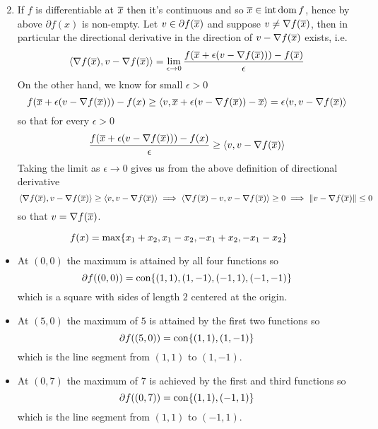 \documentclass{article}
\newenvironment{ex}[1]
  {\renewcommand\theexercise{#1}\exercise}
  {\endexercise}
\DeclareMathOperator*{\dom}{dom}
\DeclareMathOperator*{\inte}{int}
\DeclareMathOperator*{\con}{con}
\begin{document}
\begin{ex}{7.20}
\begin{enumerate}[label=(\alph*)]
$$      $$
    \item
      If $f$ is differentiable at $\overline{x}$ then it's continuous and so $\xb \in \inte \dom f$, hence by above $\partial f(x)$ is non-empty. Let $v \in \partial f(\overline{x})$ and suppose $v \ne \nabla f(\overline{x})$, then in particular the directional derivative in the direction of $v - \nabla f(\overline{x})$ exists, i.e.
      $$
      \langle\nabla f(\overline{x}), v - \nabla f(\overline{x})\rangle = \lim_{\epsilon \to 0} \frac{f(\overline{x} + \epsilon (v - \nabla f(\overline{x}))) - f(\overline{x})}{\epsilon}
      $$
      On the other hand, we know for small $\epsilon > 0$
      $$
      f(\overline{x} + \epsilon (v - \nabla f(\overline{x}))) - f(x) \ge \langle v, \overline{x} + \epsilon (v - \nabla f(\overline{x})) - \overline{x}\rangle = \epsilon \langle v, v - \nabla f(\overline{x})\rangle
      $$
      so that for every $\epsilon > 0$
      $$
      \frac{f(\overline{x} + \epsilon (v - \nabla f(\overline{x}))) - f(x)}{\epsilon} \ge \langle v, v - \nabla f(\overline{x})\rangle
      $$
      Taking the limit as $\epsilon \to 0$ gives us from the above definition of directional derivative
      $$
      \langle\nabla f(\overline{x}), v - \nabla f(\overline{x})\rangle \ge \langle v, v - \nabla f(\overline{x})\rangle \implies \langle\nabla f(\overline{x}) - v, v - \nabla f(\overline{x})\rangle \ge 0 \implies \lVert v - \nabla f(\overline{x})\rVert \le 0
      $$
      so that $v = \nabla f(\overline{x})$.
  \end{enumerate}
\end{ex} %
\begin{ex}{7.22} %
  $$
  f(x) = \max \{x_1 + x_2, x_1 - x_2, -x_1 + x_2, -x_1 - x_2\}
  $$
  \begin{itemize}
    \item At $(0, 0)$ the maximum is attained by all four functions so
      $$
      \partial f((0, 0)) = \con \braces{ (1, 1), (1, -1), (-1, 1), (-1, -1) }
      $$
      which is a square with sides of length $2$ centered at the origin.
    \item
      At $(5, 0)$ the maximum of $5$ is attained by the first two functions so
      $$
      \partial f((5, 0)) = \con \braces{ (1, 1), (1, -1) }
      $$
      which is the line segment from $(1, 1)$ to $(1, -1)$.
    \item 
      At $(0, 7)$ the maximum of $7$ is achieved by the first and third functions so
      $$
      \partial f((0, 7)) = \con \braces{ (1, 1), (-1, 1) }
      $$
      which is the line segment from $(1, 1)$ to $(-1, 1)$.
  \end{itemize}
\end{ex} %
\end{document}
